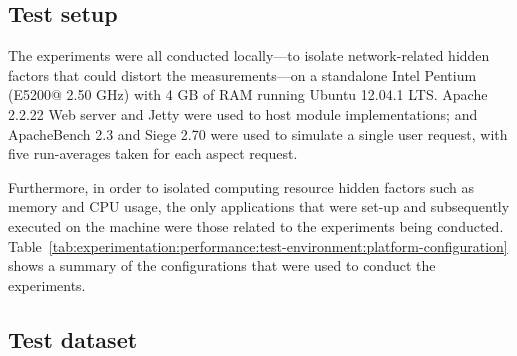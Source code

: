 \subsection{Test setup}
\label{sec:experimentation:performance:test-environment}

The experiments were all conducted locally---to isolate network-related hidden factors that could distort the measurements---on a standalone Intel Pentium (E5200@ 2.50 GHz) with 4 GB of RAM running Ubuntu 12.04.1 LTS. Apache 2.2.22 Web server and Jetty were used to host module implementations; and ApacheBench 2.3 and Siege 2.70 were used to simulate a single user request, with five run-averages taken for each aspect request. 

Furthermore, in order to isolated computing resource hidden factors such as memory and CPU usage, the only applications that were set-up and subsequently executed on the machine were those related to the experiments being conducted. Table~\ref{tab:experimentation:performance:test-environment:platform-configuration} shows a summary of the configurations that were used to conduct the experiments.

\tablespacing

\bodyspacing


\subsection{Test dataset}
\label{sec:evaluation:performance:test-environment:dataset}

